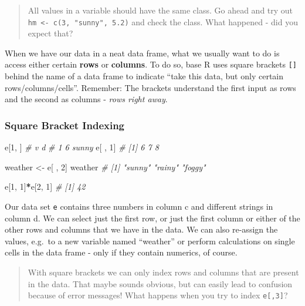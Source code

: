 \documentclass[
]{book}
\newenvironment{Shaded}{\begin{snugshade}}{\end{snugshade}}
\newcommand{\CommentTok}[1]{\textcolor[rgb]{0.56,0.35,0.01}{\textit{#1}}}
\newcommand{\DecValTok}[1]{\textcolor[rgb]{0.00,0.00,0.81}{#1}}
\newcommand{\NormalTok}[1]{#1}
\newcommand{\OtherTok}[1]{\textcolor[rgb]{0.56,0.35,0.01}{#1}}
\newcommand{\SpecialCharTok}[1]{\textcolor[rgb]{0.81,0.36,0.00}{\textbf{#1}}}
\begin{document}
\begin{quote}
All values in a variable should have the same class.
Go ahead and try out \texttt{hm\ \textless{}-\ c(3,\ "sunny",\ 5.2)} and check the class.
What happened - did you expect that?
\end{quote}

When we have our data in a neat data frame, what we usually want to do is access either certain \textbf{rows} or \textbf{columns}.
To do so, base R uses square brackets \texttt{{[}{]}} behind the name of a data frame to indicate ``take this data, but only certain rows/columns/cells''.
Remember: The brackets understand the first input as rows and the second as columns - \emph{rows right away}.

\subsubsection*{Square Bracket Indexing}\label{square-bracket-indexing}

\begin{Shaded}
\begin{Highlighting}[]
\NormalTok{e[}\DecValTok{1}\NormalTok{, ]}
\CommentTok{\#   v     d}
\CommentTok{\# 1 6 sunny}
\NormalTok{e[ , }\DecValTok{1}\NormalTok{]}
\CommentTok{\# [1] 6 7 8}

\NormalTok{weather }\OtherTok{\textless{}{-}}\NormalTok{ e[ , }\DecValTok{2}\NormalTok{]}
\NormalTok{weather}
\CommentTok{\# [1] "sunny" "rainy" "foggy"}

\NormalTok{e[}\DecValTok{1}\NormalTok{, }\DecValTok{1}\NormalTok{]}\SpecialCharTok{*}\NormalTok{e[}\DecValTok{2}\NormalTok{, }\DecValTok{1}\NormalTok{]}
\CommentTok{\# [1] 42}
\end{Highlighting}
\end{Shaded}

Our data set \texttt{e} contains three numbers in column c and different strings in column d.
We can select just the first row, or just the first column or either of the other rows and columns that we have in the data.
We can also re-assign the values, e.g.~to a new variable named ``weather'' or perform calculations on single cells in the data frame - only if they contain numerics, of course.

\begin{quote}
With square brackets we can only index rows and columns that are present in the data.
That maybe sounds obvious, but can easily lead to confusion because of error messages!
What happens when you try to index \texttt{e{[},3{]}}?
\end{quote}
\end{document}
